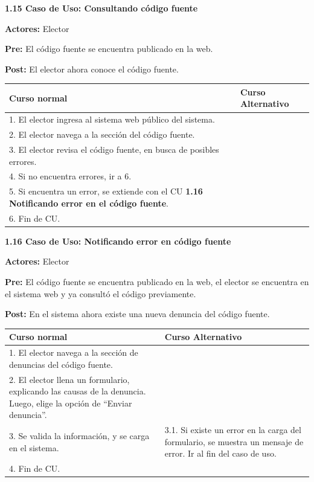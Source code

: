 \textbf{1.15 Caso de Uso: Consultando código fuente}

\textbf{Actores:} Elector

\textbf{Pre:} El código fuente se encuentra publicado en la web.

\textbf{Post:} El elector ahora conoce el código fuente.

\begin{table}[h!]
	
 \begin{tabular}{|p{7.5cm} | p{7.5cm}|} 
 \hline
 \textbf{Curso normal} & \textbf{Curso Alternativo} \\
 \hline
1. El elector ingresa al sistema web público del sistema. & \\
 \hline


2. El elector navega a la sección del código fuente. & \\
 \hline


3. El elector revisa el código fuente, en busca de posibles errores. & \\
 \hline


4. Si no encuentra errores, ir a 6. & \\
 \hline


5. Si encuentra un error, se extiende con el CU \textbf{1.16 Notificando error en el código fuente}. & \\
 \hline


6. Fin de CU. & \\
 \hline

 \end{tabular}

\end{table}


\textbf{1.16 Caso de Uso: Notificando error en código fuente}

\textbf{Actores:}  Elector

\textbf{Pre:} El código fuente se encuentra publicado en la web, el elector se encuentra en el sistema web y ya consultó el código previamente.

\textbf{Post:} En el sistema ahora existe una nueva denuncia del código fuente.
\begin{table}[h!]
	
 \begin{tabular}{|p{7.5cm} | p{7.5cm}|} 
 \hline
 \textbf{Curso normal} & \textbf{Curso Alternativo} \\
 \hline
1. El elector navega a la sección de denuncias del código fuente. & \\
\hline


2. El elector llena un formulario, explicando las causas de la denuncia. Luego, elige la opción de “Enviar denuncia”. & \\
\hline


3. Se valida la información, y se carga en el sistema. & 3.1. Si existe un error en la carga del formulario, se muestra un mensaje de error. Ir al fin del caso de uso. \\
\hline
4. Fin de CU.& \\
\hline
 \end{tabular}

\end{table}



